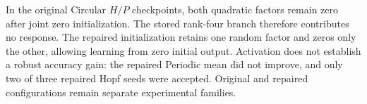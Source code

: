 In the original Circular $H/P$ checkpoints, both quadratic factors
remain zero after joint zero initialization. The stored rank-four
branch therefore contributes no response. The repaired initialization
retains one random factor and zeros only the other, allowing learning
from zero initial output. Activation does not establish a robust
accuracy gain: the repaired Periodic mean did not improve, and only
two of three repaired Hopf seeds were accepted. Original and repaired
configurations remain separate experimental families.
